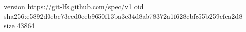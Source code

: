 version https://git-lfs.github.com/spec/v1
oid sha256:e5892d0ebc73eed0eeb9650f13ba3c34d8ab78372a1f628cbfc55b259cfca2d8
size 43864
